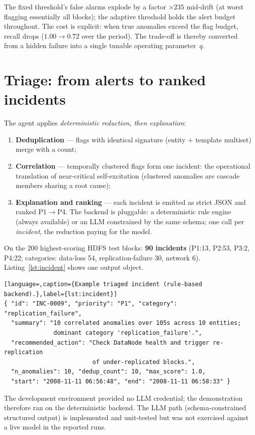 \documentclass[11pt,a4paper]{report}
\begin{document}
The fixed threshold's false alarms explode by a factor
$\times235$ mid-drift (at worst flagging essentially all blocks); the
adaptive threshold holds the alert budget throughout. The cost is
explicit: when true anomalies exceed the flag budget, recall drops
($1.00\to0.72$ over the period). The trade-off is thereby converted from a
hidden failure into a single tunable operating parameter~$q$.

\section{Triage: from alerts to ranked incidents}
\label{sec:impl-triage}
The agent applies \emph{deterministic reduction, then explanation}:
\begin{enumerate}[nosep,leftmargin=1.6em]
  \item \textbf{Deduplication} --- flags with identical signature (entity +
  template multiset) merge with a count;
  \item \textbf{Correlation} --- temporally clustered flags form one
  incident: the operational translation of near-critical
  self-excitation (clustered anomalies are cascade members sharing a root
  cause);
  \item \textbf{Explanation and ranking} --- each incident is emitted as
  strict JSON and ranked P1$\to$P4. The backend is pluggable: a
  deterministic rule engine (always available) or an LLM constrained by the
  same schema; one call per \emph{incident}, the reduction paying for the
  model.
\end{enumerate}
On the 200 highest-scoring HDFS test blocks: \textbf{90 incidents}
(P1:13, P2:53, P3:2, P4:22; categories: data-loss 54,
replication-failure 30, network 6). Listing~\ref{lst:incident} shows one
output object.

\begin{lstlisting}[language=,caption={Example triaged incident (rule-based
backend).},label={lst:incident}]
{ "id": "INC-0009", "priority": "P1", "category": "replication_failure",
  "summary": "10 correlated anomalies over 105s across 10 entities;
              dominant category 'replication_failure'.",
  "recommended_action": "Check DataNode health and trigger re-replication
                         of under-replicated blocks.",
  "n_anomalies": 10, "dedup_count": 10, "max_score": 1.0,
  "start": "2008-11-11 06:56:48", "end": "2008-11-11 06:58:33" }
\end{lstlisting}

\begin{remark}
The development environment provided no LLM credential; the demonstration
therefore ran on the deterministic backend. The LLM path (schema-constrained
structured output) is implemented and unit-tested but was not exercised
against a live model in the reported runs.
\end{remark}
\end{document}
